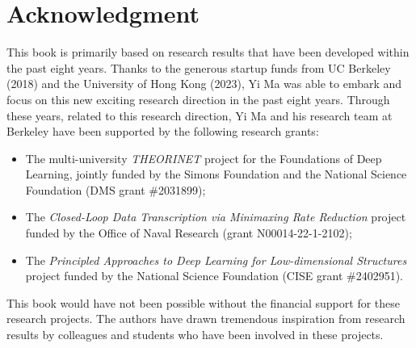 \documentclass[../../book-main.tex]{subfiles}
\begin{document}
\chapter*{Acknowledgment}
This book is primarily based on research results that have been developed within the past eight years. Thanks to the generous startup funds from UC Berkeley (2018) and the University of Hong Kong (2023), Yi Ma was able to embark and focus on this new exciting research direction in the past eight years. Through these years, related to this research direction, Yi Ma and his research team at Berkeley have been supported by the following research grants:
\begin{itemize}
    \item The multi-university {\em THEORINET} project for the Foundations of Deep Learning, jointly funded by the Simons Foundation and the National Science Foundation (DMS grant \#2031899);
    \item The {\em Closed-Loop Data Transcription via Minimaxing Rate Reduction} project funded by the Office of Naval Research (grant N00014-22-1-2102); 
    \item The {\em Principled Approaches to Deep Learning for Low-dimensional Structures} project funded by the National Science Foundation (CISE grant \#2402951).
\end{itemize} 
This book would have not been possible without the financial support for these research projects. The authors have drawn tremendous inspiration from research results by colleagues and students who have been involved in these projects.
\end{document}

